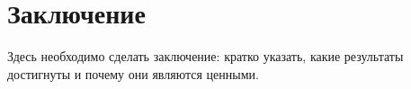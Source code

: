 \section{Заключение}

Здесь необходимо сделать заключение: кратко указать, какие результаты достигнуты и почему они являются ценными.
